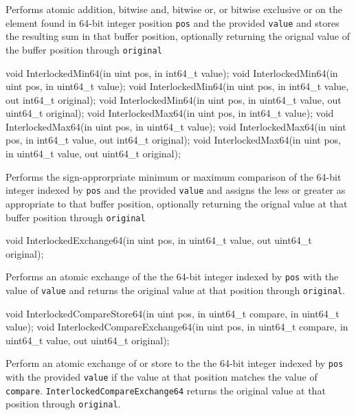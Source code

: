 Performs atomic addition, bitwise and, bitwise or, or bitwise exclusive or
on the element found in 64-bit integer position \texttt{pos} and the provided \texttt{value}
and stores the resulting sum in that buffer position,
optionally returning the orignal value of the buffer position through \texttt{original}

\begin{HLSL}
   void InterlockedMin64(in uint pos, in int64_t value);
   void InterlockedMin64(in uint pos, in uint64_t value);
   void InterlockedMin64(in uint pos, in int64_t value, out int64_t original);
   void InterlockedMin64(in uint pos, in uint64_t value, out uint64_t original);
   void InterlockedMax64(in uint pos, in int64_t value);
   void InterlockedMax64(in uint pos, in uint64_t value);
   void InterlockedMax64(in uint pos, in int64_t value, out int64_t original);
   void InterlockedMax64(in uint pos, in uint64_t value, out uint64_t original);
\end{HLSL}

Performs the sign-approrpriate minimum or maximum comparison of the 64-bit integer indexed by \texttt{pos}
and the provided \texttt{value} and assigns the less or greater as appropriate to that buffer position,
optionally returning the orignal value at that buffer position through \texttt{original}

\begin{HLSL}
   void InterlockedExchange64(in uint pos, in uint64_t value, out uint64_t original);
\end{HLSL}

Performs an atomic exchange of the the 64-bit integer indexed by \texttt{pos} with
the value of \texttt{value} and returns the original value at that position through \texttt{original}.

\begin{HLSL}
   void InterlockedCompareStore64(in uint pos, in uint64_t compare,
                                   in uint64_t value);
   void InterlockedCompareExchange64(in uint pos, in uint64_t compare,
                                      in uint64_t value, out uint64_t original);
\end{HLSL}

Perform an atomic exchange of or store to the the 64-bit integer indexed by \texttt{pos}
with the provided \texttt{value} if the value at that position matches the value of \texttt{compare}.
\texttt{InterlockedCompareExchange64} returns the original value at that position through \texttt{original}.

